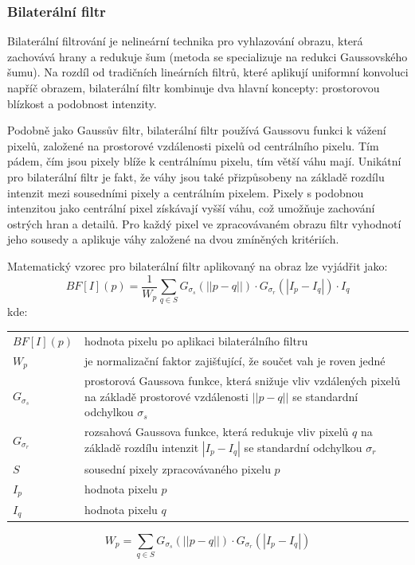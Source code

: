 \documentclass[male,czech,api_ing]{thesis}
\makeatletter
\newenvironment{conditions}[1][kde:]
    {#1 \begin{tabular}[t]{>{$}l<{$} @{${}={}$} >{\raggedright\arraybackslash}p{10cm}}}
    {\end{tabular}}
\makeatother
\begin{document}
\subsubsection{Bilaterální filtr}
Bilaterální filtrování je nelineární technika pro vyhlazování obrazu, která zachovává hrany a redukuje šum (metoda se specializuje na redukci Gaussovského šumu). Na rozdíl od tradičních lineárních filtrů, které aplikují uniformní konvoluci napříč obrazem, bilaterální filtr kombinuje dva hlavní koncepty: prostorovou blízkost a podobnost intenzity. 

Podobně jako Gaussův filtr, bilaterální filtr používá Gaussovu funkci k vážení pixelů, založené na prostorové vzdálenosti pixelů od centrálního pixelu. Tím pádem, čím jsou pixely blíže k centrálnímu pixelu, tím větší váhu mají. Unikátní pro bilaterální filtr je fakt, že váhy jsou také přizpůsobeny na základě rozdílu intenzit mezi sousedními pixely a centrálním pixelem. Pixely s podobnou intenzitou jako centrální pixel získávají vyšší váhu, což umožňuje zachování ostrých hran a detailů. Pro každý pixel ve zpracovávaném obrazu filtr vyhodnotí jeho sousedy a aplikuje váhy založené na dvou zmíněných kritériích. \cite{BilateralFilter}

Matematický vzorec pro bilaterální filtr aplikovaný na obraz lze vyjádřit jako:
\begin{equation}
    BF[I](p) = \frac{1}{W_p} \sum_{q \in S} G_{\sigma_s}(||p-q||) \cdot G_{\sigma_r}(|I_p - I_q|) \cdot I_q
\end{equation}
\begin{conditions}
    BF[I](p) & hodnota pixelu po aplikaci bilaterálního filtru \\
    W_p & je normalizační faktor zajišťující, že součet vah je roven jedné \\
    G_{\sigma_s} & prostorová Gaussova funkce, která snižuje vliv vzdálených pixelů na základě prostorové vzdálenosti $||p-q||$ se standardní odchylkou $\sigma_s$ \\
    G_{\sigma_r} & rozsahová Gaussova funkce, která redukuje vliv pixelů $q$ na základě rozdílu intenzit $|I_p-I_q|$ se standardní odchylkou $\sigma_r$ \\
    S & sousední pixely zpracovávaného pixelu $p$ \\
    I_p & hodnota pixelu $p$ \\
    I_q & hodnota pixelu $q$ \\
\end{conditions}

\begin{equation}
    W_p = \sum_{q \in S} G_{\sigma_s}(||p-q||) \cdot G_{\sigma_r}(|I_p - I_q|)
\end{equation}
\end{document}
